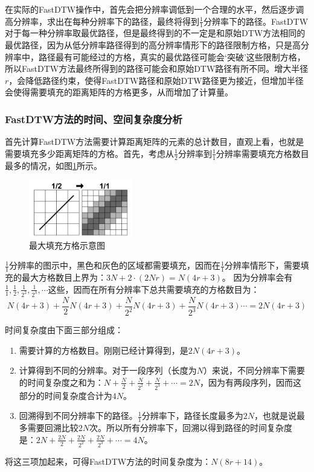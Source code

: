 在实际的FastDTW操作中，首先会把分辨率调低到一个合理的水平，然后逐步调高分辨率，求出在每种分辨率下的路径，最终将得到$\frac{1}{1}$分辨率下的路径。FastDTW对于每一种分辨率取最优路径，但是最终得到的不一定是和原始DTW方法相同的最优路径，因为从低分辨率路径得到的高分辨率情形下的路径限制方格，只是高分辨率中，路径最有可能经过的方格，真实的最优路径可能会‘突破’这些限制方格，所以FastDTW方法最终所得到的路径可能会和原始DTW路径有所不同。增大半径$r$，会降低路径约束，使得FastDTW路径和原始DTW路径更为接近，但增加半径会使得需要填充的距离矩阵的方格更多，从而增加了计算量。

\subsubsection{FastDTW方法的时间、空间复杂度分析}
首先计算FastDTW方法需要计算距离矩阵的元素的总计数目，直观上看，也就是需要填充多少距离矩阵的方格。首先，考虑从$\frac{1}{2}$分辨率到$\frac{1}{1}$分辨率需要填充方格数目最多的情况，如图\ref{fig:11}所示。
\begin{figure}[h]
  \centering
  \includegraphics[width=0.4\textwidth]{./figure/evaluation.PNG}
  \caption{最大填充方格示意图}\label{fig:11}
\end{figure}

$\frac{1}{1}$分辨率的图示中，黑色和灰色的区域都需要填充，因而在$\frac{1}{1}$分辨率情形下，需要填充的最大方格数目上界为：$3N + 2\cdot (2Nr) = N(4r+3)$。 因为分辨率会有$\frac{1}{1},\frac{1}{2},\frac{1}{2^2},\frac{1}{2^3},\cdots$这些，因而在所有分辨率下总共需要填充的方格数目为：
\begin{equation}\label{equ:9}
  N\left( {4r + 3} \right) + \frac{N}{2}N\left( {4r + 3} \right) + \frac{N}{{{2^2}}}N\left( {4r + 3} \right) + \frac{N}{{{2^3}}}N\left( {4r + 3} \right) \cdots  = 2N\left( {4r + 3} \right)
\end{equation}

时间复杂度由下面三部分组成：
\begin{enumerate}
  \item 需要计算的方格数目。刚刚已经计算得到，是$2N\left( {4r+3}\right)$。
  \item 计算得到不同的分辨率。对于一段序列（长度为$N$）来说，不同分辨率下需要的时间复杂度之和为：$N + \frac{N}{2} + \frac{N}{2^2} + \frac{N}{2^3} + \cdots = 2N$，因为有两段序列，因而这部分的时间复杂度合计为$4N$。
  \item 回溯得到不同分辨率下的路径。$\frac{1}{1}$分辨率下，路径长度最多为$2N$，也就是说最多需要回溯比较$2N$次。所以所有分辨率下，回溯以得到路径的时间复杂度是：$2N + \frac{2N}{2} + \frac{2N}{2^2} + \frac{2N}{2^3} + \cdots = 4N$。
\end{enumerate}
将这三项加起来，可得FastDTW方法的时间复杂度为：$N(8r+14)$。

